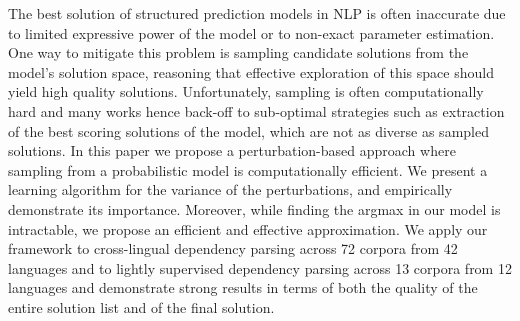The best solution of structured prediction models in NLP is often inaccurate due to limited expressive power of the model or to non-exact parameter estimation. One way to mitigate this problem is sampling candidate solutions from the model's solution space, reasoning that effective exploration of this space should yield high quality solutions. Unfortunately, sampling is often computationally hard and many works hence back-off to sub-optimal strategies such as extraction of the best scoring solutions of the model, which are not as diverse as sampled solutions. In this paper we propose a perturbation-based approach where sampling from a probabilistic model is computationally efficient. We present a learning algorithm for the variance of the perturbations, and empirically demonstrate its importance. Moreover, while finding the argmax in our model is intractable, we propose an efficient and effective approximation. We apply our framework to cross-lingual dependency parsing across 72 corpora from 42 languages and to lightly supervised dependency parsing across 13 corpora from 12 languages and demonstrate strong results in terms of both the quality of the entire solution list and of the final solution.